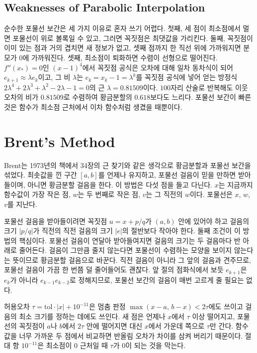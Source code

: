 \subsection{Weaknesses of Parabolic Interpolation}

순수한 포물선 보간은 세 가지 이유로 혼자 쓰기 어렵다. 첫째, 세 점이 최소점에서 멀면 포물선이 위로 볼록일 수 있고, 그러면 꼭짓점은 최댓값을 가리킨다. 둘째, 꼭짓점이 이미 있는 점과 거의 겹치면 새 정보가 없고, 셋째 점까지 한 직선 위에 가까워지면 분모가 $0$에 가까워진다. 셋째, 최소점이 퇴화하면 수렴이 선형으로 떨어진다. $f''(x_\ast)=0$인 $(x-1)^4$에서 꼭짓점 공식은 오차에 대해 일차 동차식이 되어 $e_{k+1}\approx\lambda e_k$이고, 그 비 $\lambda$는 $e_k=x_k-1=\lambda^k$를 꼭짓점 공식에 넣어 얻는 방정식 $2\lambda^4+2\lambda^3+\lambda^2-2\lambda-1=0$의 근 $\lambda=0.81509$이다. $100$자리 산술로 반복해도 이웃 오차의 비가 $0.81509$로 수렴하여 황금분할의 $0.618$보다도 느리다. 포물선 보간이 빠른 것은 함수가 최소점 근처에서 이차 함수처럼 생겼을 때뿐이다.

\section{Brent's Method}
\label{sec:brent-min}

Brent는 1973년의 책에서 34장의 근 찾기와 같은 생각으로 황금분할과 포물선 보간을 섞었다\cite{brent1973}. 최솟값을 낀 구간 $[a,b]$를 언제나 유지하고, 포물선 걸음이 믿을 만하면 받아들이며, 아니면 황금분할 걸음을 한다. 이 방법은 다섯 점을 들고 다닌다. $x$는 지금까지 함수값이 가장 작은 점, $w$는 두 번째로 작은 점, $v$는 그 직전의 $w$이다. 포물선은 $x$, $w$, $v$를 지난다.

포물선 걸음을 받아들이려면 꼭짓점 $u=x+p/q$가 $(a,b)$ 안에 있어야 하고 걸음의 크기 $|p/q|$가 직전의 직전 걸음의 크기 $|e|$의 절반보다 작아야 한다. 둘째 조건이 이 방법의 핵심이다. 포물선 걸음이 연달아 받아들여지면 걸음의 크기는 두 걸음마다 반 아래로 줄어든다. 걸음이 그만큼 줄지 않는다면 포물선이 수렴하는 모양을 보이지 않는다는 뜻이므로 황금분할 걸음으로 바꾼다. 직전 걸음이 아니라 그 앞의 걸음과 견주므로, 포물선 걸음이 가끔 한 번쯤 덜 줄어들어도 괜찮다. 앞 절의 점화식에서 보듯 $e_{k+1}$은 $e_k$가 아니라 $e_{k-1}e_{k-2}$로 정해지므로, 포물선 보간의 걸음이 매번 고르게 줄 필요는 없다.

허용오차 $\tau=\mathrm{tol}\cdot|x|+10^{-11}$은 멈춤 판정 $\max(x-a,\,b-x)<2\tau$에도 쓰이고 걸음의 최소 크기를 정하는 데에도 쓰인다. 새 점은 언제나 $x$에서 $\tau$ 이상 떨어지고, 포물선의 꼭짓점이 $a$나 $b$에서 $2\tau$ 안에 떨어지면 대신 $x$에서 가운데 쪽으로 $\tau$만 간다. 함수값을 너무 가까운 두 점에서 비교하면 반올림 오차가 차이를 삼켜 버리기 때문이다. 절대 항 $10^{-11}$은 최소점이 $0$ 근처일 때 $\tau$가 $0$이 되는 것을 막는다.

